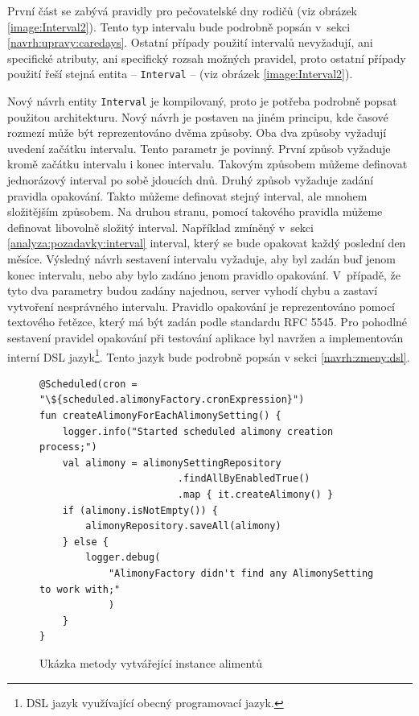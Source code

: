         První část se zabývá pravidly pro pečovatelské dny rodičů (viz obrázek \ref{image:Interval2}). Tento typ intervalu bude podrobně popsán v~sekci \ref{navrh:upravy:caredays}. Ostatní případy použití intervalů nevyžadují, ani specifické atributy, ani specifický rozsah možných pravidel, proto ostatní případy použití řeší stejná entita -- \verb|Interval| -- (viz obrázek \ref{image:Interval2}).
        
    
        Nový návrh entity \verb|Interval| je kompilovaný, proto je potřeba podrobně popsat použitou architekturu. Nový návrh je postaven na jiném principu, kde časové rozmezí může být reprezentováno dvěma způsoby. Oba dva způsoby vyžadují uvedení začátku intervalu. Tento parametr je povinný. První způsob vyžaduje kromě začátku intervalu i konec intervalu. Takovým způsobem můžeme definovat jednorázový interval po sobě jdoucích dnů. Druhý způsob vyžaduje zadání pravidla opakování. Takto můžeme definovat stejný interval, ale mnohem složitějším způsobem. Na druhou stranu, pomocí takového pravidla můžeme definovat libovolně složitý interval. 
        Například zmíněný v~sekci \ref{analyza:pozadavky:interval} interval, který se bude opakovat každý poslední den měsíce. Výsledný návrh sestavení intervalu vyžaduje, aby byl zadán buď jenom konec intervalu, nebo aby bylo zadáno jenom pravidlo opakování. V~případě, že tyto dva parametry budou zadány najednou, server vyhodí chybu a zastaví vytvoření nesprávného intervalu. Pravidlo opakování je reprezentováno pomocí textového řetězce, který má být zadán podle standardu {RFC 5545}.\cite{recurrence-rule} Pro pohodlné sestavení pravidel opakování při testování aplikace byl navržen a implementován {interní DSL jazyk}\footnote{DSL jazyk využívající obecný programovací jazyk.}. Tento jazyk bude podrobně popsán v sekci \ref{navrh:zmeny:dsl}.
        \begin{figure}[h]
                \begin{verbatim}
@Scheduled(cron = "\${scheduled.alimonyFactory.cronExpression}")
fun createAlimonyForEachAlimonySetting() {
    logger.info("Started scheduled alimony creation process;")
    val alimony = alimonySettingRepository
                        .findAllByEnabledTrue()
                        .map { it.createAlimony() }
    if (alimony.isNotEmpty()) {
        alimonyRepository.saveAll(alimony)
    } else {
        logger.debug(
            "AlimonyFactory didn't find any AlimonySetting to work with;"
            )
    }
}
                \end{verbatim}
                \caption{Ukázka metody vytvářející instance alimentů} 
                \label{code:create-alimony}
            \end{figure}
        
